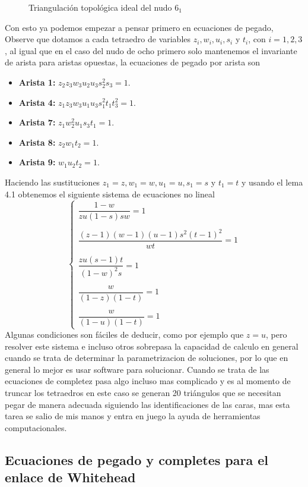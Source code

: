 \begin{figure}[H]
\centering

    \caption{Triangulación topológica ideal del nudo $6_1$}
\end{figure}
Con esto ya podemos empezar a pensar primero en ecuaciones de pegado, Observe que dotamos a cada tetraedro de variables $z_i,w_i,u_i,s_i$ y $t_i$, con $i=1,2,3$, al igual que en el caso del nudo de ocho primero solo mantenemos el invariante de arista para aristas opuestas, la ecuaciones de pegado por arista son
\begin{itemize}
    \item \textbf{Arista 1:} $z_2z_3w_3u_2u_3s_2^2s_3=1.$
    \item \textbf{Arista 4:} $z_1z_3w_3u_1u_3s_1^2t_1t_3^2=1.$
    \item \textbf{Arista 7:} $z_1w_2^2u_1s_3t_1=1.$
    \item \textbf{Arista 8:} $z_2w_1t_2=1.$
    \item \textbf{Arista 9:} $w_1u_2t_2=1.$
\end{itemize}
Haciendo las sustituciones $z_1=z,w_1=w,u_1=u,s_1=s$ y $t_1=t$ y usando el lema 4.1 obtenemos el siguiente sistema de ecuaciones no lineal
$$\begin{cases}
    \dfrac{1-w}{zu(1-s)sw}=1\\
    \\
    \dfrac{(z-1)(w-1)(u-1)s^2(t-1)^2}{wt}=1\\
    \\
    \dfrac{zu(s-1)t}{(1-w)^2s}=1\\
    \\
    \dfrac{w}{(1-z)(1-t)}=1\\
    \\
    \dfrac{w}{(1-u)(1-t)}=1
\end{cases}$$
Algunas condiciones son fáciles de deducir, como por ejemplo que $z=u$, pero resolver este sistema e incluso otros sobrepasa la capacidad de calculo en general cuando se trata de determinar la parametrizacion de soluciones, por lo que  en general lo mejor es usar software para solucionar. Cuando se trata de las ecuaciones de completez pasa algo incluso mas complicado y es al momento de truncar los tetraedros en este caso se generan 20 triángulos que se necesitan pegar de manera adecuada siguiendo las identificaciones de las caras, mas esta tarea se salio de mis manos y entra en juego la ayuda de herramientas computacionales.

\subsection{Ecuaciones de pegado y completes para el enlace de Whitehead}

